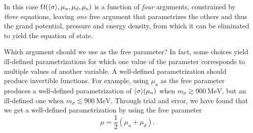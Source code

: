 In this case $\Omega(\langle \sigma \rangle,\mu_u,\mu_d,\mu_e)$ is a function of \emph{four} arguments,
constrained by \emph{three} equations,
leaving \emph{one} free argument that parametrizes the others and thus the grand potential, pressure and energy density,
from which it can be eliminated to yield the equation of state.

Which argument should we use as the free parameter?
In fact, some choices yield ill-defined parametrizations for which one value of the parameter corresponds to multiple values of another variable.
A well-defined parametrization should produce invertible functions.
For example, using $\mu_u$ as the free parameter produces a well-defined parametrization of $\langle \sigma \rangle(\mu_u)$ when $m_\sigma \gtrsim \SI{900}{\mega\electronvolt}$, but an ill-defined one when $m_\sigma \lesssim \SI{900}{\mega\electronvolt}$.
Through trial and error, we have found that we get a well-defined parametrization by using the free parameter
\begin{equation}
	\mu = \frac12 (\mu_u + \mu_d) .
\label{eq:lsm:quark_chemical_potential}
\end{equation}

